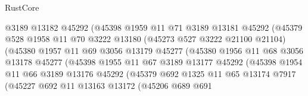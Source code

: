 \begin{lexlean}{RustCore}
\begin{coremodule}
                            @3189
                            @13182
                            @45292
                            (@45398
                              @1959
                              @11
                              @71
                              @3189
                              @13181
                              @45292
                              (@45379
                                @528
                                @1958
                                @11
                                @70
                                @3222
                                @13180
                                (@45273 @527 @3222 @21100 @21104)
                                (@45380
                                  @1957
                                  @11
                                  @69
                                  @3056
                                  @13179
                                  @45277
                                  (@45380
                                    @1956
                                    @11
                                    @68
                                    @3056
                                    @13178
                                    @45277
                                    (@45398
                                      @1955
                                      @11
                                      @67
                                      @3189
                                      @13177
                                      @45292
                                      (@45398
                                        @1954
                                        @11
                                        @66
                                        @3189
                                        @13176
                                        @45292
                                        (@45379
                                          @692
                                          @1325
                                          @11
                                          @65
                                          @13174
                                          @7917
                                          (@45227
                                            @692
                                            @11
                                            @13163
                                            @13172
                                            (@45206
                                              @689
                                              @691

\end{coremodule}
\end{lexlean}
